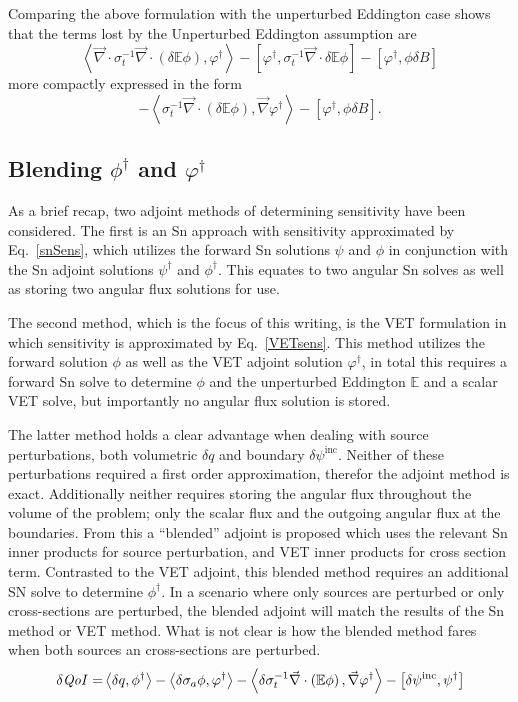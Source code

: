 \documentclass[12pt]{report}
\newcommand{\bra}{\left\langle}
\newcommand{\ket}{\right\rangle}
\newcommand{\sbra}{\left[}
\newcommand{\sket}{\right]}
\renewcommand{\div}{\vec{\nabla} \cdot}
\newcommand{\grad}{\vec{\nabla}}
\newcommand{\vefadj}{\varphi^\dag}
\newcommand{\Edd}{\mathbb{E}}
\newcommand{\BEdd}{B}
\newcommand{\siga}{\sigma_a}
\newcommand{\isigt}{\sigma_t^{-1}}
\newcommand{\scalSource}{q}
\newcommand{\qoi}{{\it QoI}\xspace}
\begin{document}
Comparing the above formulation with the unperturbed Eddington case shows that the terms lost by the Unperturbed Eddington assumption are 
\begin{equation}
\label{EddErrLong}
 \bra \div \isigt \div \left( \delta \Edd \phi \right), \vefadj \ket
- \sbra  \vefadj ,\isigt \div \delta \Edd \phi \sket
- \sbra \vefadj, \phi \delta \BEdd \sket
\end{equation} 
more compactly expressed in the form
\begin{equation}
\label{EddErr}
 - \bra  \isigt \div \left( \delta \Edd \phi \right), \grad \vefadj \ket
- \sbra \vefadj, \phi \delta \BEdd \sket.
\end{equation} 


\subsection{Blending $\phi^\dag$ and $\varphi^\dag$}
As a brief recap, two adjoint methods of determining sensitivity have been considered. The first is an Sn approach with sensitivity approximated by Eq.~\eqref{snSens}, which utilizes the forward Sn solutions $\psi$ and $\phi$ in conjunction with the Sn adjoint solutions $\psi^\dag$ and $\phi^\dag$. This equates to two angular Sn solves as well as storing two angular flux solutions for use. 

The second method, which is the focus of this writing, is the VET formulation in which sensitivity is approximated by Eq.~\eqref{VETsens}. This method utilizes the forward solution $\phi$ as well as the VET adjoint solution $\vefadj$, in total this requires a forward Sn solve to determine $\phi$ and the unperturbed Eddington $\Edd$ and a scalar VET solve, but importantly no angular flux solution is stored.

The latter method holds a clear advantage when dealing with source perturbations, both volumetric $\delta q$ and boundary $\delta \psi^\text{inc}$. Neither of these perturbations required a first order approximation, therefor the adjoint method is exact. Additionally neither requires storing the angular flux throughout the volume of the problem; only the scalar flux and the outgoing angular flux at the boundaries. From this a ``blended'' adjoint is proposed which uses the relevant Sn inner products for source perturbation, and VET inner products for cross section term. Contrasted to the VET adjoint, this blended method requires an additional SN solve to determine $\phi^\dag$. In a scenario where only sources are perturbed or only cross-sections are perturbed, the blended adjoint will match the results of the Sn method or VET method. What is not clear is how the blended method fares when both sources an cross-sections are perturbed.
\begin{equation}
\label{Blendsens}
\begin{split}
\delta \qoi =&  \bra \delta \scalSource , \phi^\dag \ket - \bra \delta \siga \phi, \vefadj \ket - \bra \delta \isigt \div \left( \Edd \phi \right) , \grad \vefadj \ket
- \sbra \delta \psi^\text{inc}, \psi^\dag \sket \\
\end{split}
\end{equation}
\end{document}
